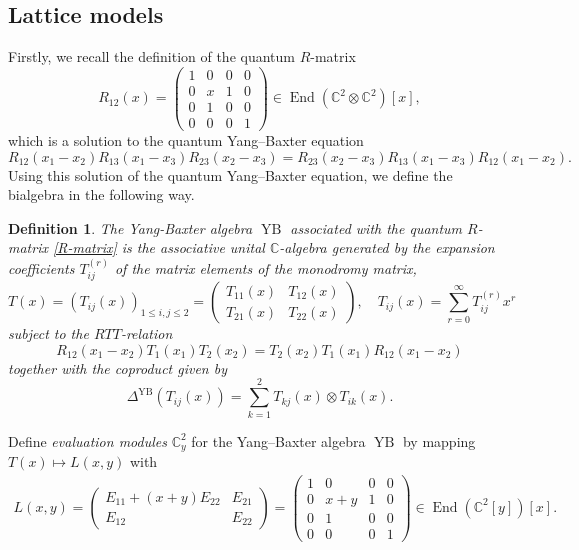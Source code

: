 \documentclass[12pt]{amsart}
\newcommand{\C}{\mathbb{C}}
\newcommand{\End}{\operatorname{End}}
\newtheorem{defn}{Definition}[section]
\numberwithin{equation}{section}
\numberwithin{figure}{section}
\newcommand{\YB}{\operatorname{YB}}
\begin{document}
\subsection{Lattice models}
\noindent Firstly, we recall the definition of the quantum $R$-matrix
\begin{equation}
    \label{R-matrix}
    R_{12}(x) = \begin{pmatrix}
        1 & 0 & 0 & 0 \\
        0 & x & 1 & 0 \\
        0 & 1 & 0 & 0 \\
        0 & 0 & 0 & 1
    \end{pmatrix} \in \End(\C^2 \otimes \C^2)[x],
\end{equation}
which is a solution to the quantum Yang--Baxter equation
\begin{equation}
\label{Yang--Baxter}
R_{12}(x_1 - x_2) R_{13}(x_1 - x_3) R_{23}(x_2 - x_3) = R_{23}(x_2 - x_3) R_{13}(x_1 - x_3) R_{12}(x_1 - x_2).
\end{equation}
Using this solution of the quantum Yang--Baxter equation, we define the bialgebra in the following way.
\begin{defn}\label{YBalgebra}
    The Yang-Baxter algebra $\YB$ associated with the quantum $R$-matrix \eqref{R-matrix} is the associative unital $\C$-algebra generated by the expansion coefficients $T^{(r)}_{ij}$ of the matrix elements of the monodromy matrix,
    \[
    T(x) = ( T_{ij}(x))_{1\le i, j \le 2} = \begin{pmatrix}
        T_{11}(x) & T_{12}(x) \\
        T_{21}(x) & T_{22}(x) 
    \end{pmatrix}, \quad T_{ij}(x) = \sum\limits_{r = 0}^\infty T^{(r)}_{ij} x^r
    \]
    subject to the $RTT$-relation
    \[
    R_{12}(x_1 - x_2) T_1(x_1) T_{2}(x_2) = T_2(x_2) T_1(x_1) R_{12}(x_1 - x_2)
    \]
    together with the coproduct given by 
    \begin{equation}
    \label{coproductYB}
    \Delta^{\YB}(T_{ij}(x)) = \sum\limits_{k = 1}^2 T_{kj}(x) \otimes T_{ik}(x).
    \end{equation}
\end{defn}
Define {\em evaluation modules} $\C^2_{y}$ for the Yang--Baxter algebra $\YB$ by mapping $T(x)\mapsto L(x,y)$ with 
\begin{gather}
\label{evaluate1}
    L(x,y) = \begin{pmatrix}
        E_{11} + (x + y) E_{22} & E_{21} \\
        E_{12} & E_{22}
    \end{pmatrix} = \begin{pmatrix}
        1 & 0 & 0 & 0 \\
        0& x+y & 1 & 0 \\
        0 & 1 & 0 & 0 \\
        0 & 0 & 0 & 1
    \end{pmatrix} \in \End(\C^2[y])[x].
\end{gather}
\end{document}
